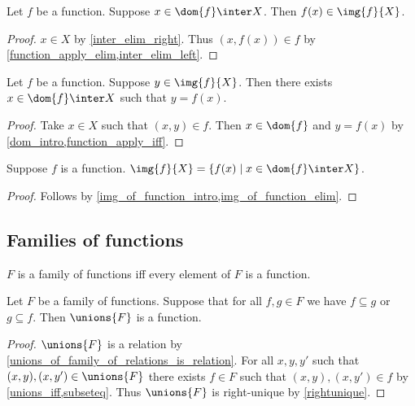 \begin{proposition}\label{img_of_function_intro}
    Let $f$ be a function.
    Suppose $x\in\dom{f}\inter X$.
    Then $f(x)\in \img{f}{X}$.
\end{proposition}
\begin{proof}
    $x\in X$ by \cref{inter_elim_right}.
    Thus $(x,f(x))\in f$ by \cref{function_apply_elim,inter_elim_left}.
\end{proof}

\begin{proposition}\label{img_of_function_elim}
    Let $f$ be a function.
    Suppose $y\in \img{f}{X}$.
    Then there exists $x\in\dom{f}\inter X$ such that $y = f(x)$.
\end{proposition}
\begin{proof}
    Take $x\in X$ such that $(x,y)\in f$.
    Then $x\in\dom{f}$ and $y = f(x)$ by \cref{dom_intro,function_apply_iff}.
\end{proof}

\begin{proposition}\label{img_of_function}
    Suppose $f$ is a function.
    $\img{f}{X} = \{ f(x) \mid x\in\dom{f}\inter X\}$.
\end{proposition}
\begin{proof}
    Follows by \cref{img_of_function_intro,img_of_function_elim}.
\end{proof}

\subsection{Families of functions}

\begin{abbreviation}\label{family_of_functions}
    $F$ is a family of functions iff
    every element of $F$ is a function.
\end{abbreviation}

\begin{proposition}\label{unions_of_compatible_family_of_function_is_function}
    Let $F$ be a family of functions.
    Suppose that for all $f,g \in F$ we have $f\subseteq g$ or $g\subseteq f$.
    Then $\unions{F}$ is a function.
\end{proposition}
\begin{proof}
    $\unions{F}$ is a relation by \cref{unions_of_family_of_relations_is_relation}.
    For all $x,y, y'$ such that $(x,y),(x,y')\in \unions{F}$
        there exists $f\in F$ such that $(x,y),(x,y')\in f$
        by \cref{unions_iff,subseteq}.
    Thus $\unions{F}$ is right-unique by \cref{rightunique}.
\end{proof}


